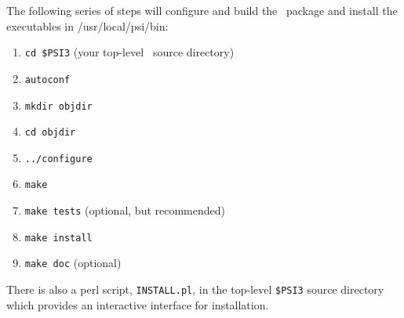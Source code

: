 \documentclass[12pt]{article}
\begin{document}
The following series of steps will configure and build the \PSIthree\
package and install the executables in /usr/local/psi/bin:

\begin{enumerate}
\item {\tt cd \$PSI3} (your top-level \PSIthree\ source directory)
\item {\tt autoconf}
\item {\tt mkdir objdir}
\item {\tt cd objdir}
\item {\tt ../configure}
\item {\tt make}
\item {\tt make tests} (optional, but recommended)
\item {\tt make install}
\item {\tt make doc} (optional)
\end{enumerate}

There is also a perl script, {\tt INSTALL.pl}, in the top-level 
{\tt \$PSI3} source directory which provides an interactive interface 
for installation.
\end{document}
